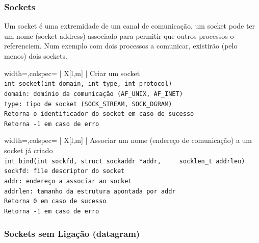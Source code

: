 \documentclass[11pt]{article}
\begin{document}
\subsubsection{Sockets}

Um socket é uma extremidade de um canal de comunicação, um socket pode ter um nome (socket address) associado para permitir que outros processos o referenciem. Num exemplo com dois processos a comunicar, existirão (pelo menos) dois sockets.

\begin{tblr}{width=\linewidth,colspec={ | X[l,m] | }}
    \hline
    \centering Criar um socket                                       \\\hline
    \lstinline|int socket(int domain, int type, int protocol)|       \\\hline
    \lstinline|domain: domínio da comunicação (AF_UNIX, AF_INET)|    \\
    \lstinline|type: tipo de socket (SOCK_STREAM, SOCK_DGRAM)|       \\\hline
    \lstinline|Retorna o identificador do socket em caso de sucesso| \\
    \lstinline|Retorna -1 em caso de erro|                           \\\hline
\end{tblr}

\begin{tblr}{width=\linewidth,colspec={ | X[l,m] | }}
    \hline
    \centering Associar um nome (endereço de comunicação) a um socket já criado \\\hline
    \lstinline|int bind(int sockfd, struct sockaddr *addr,
    socklen_t addrlen)|                                                         \\\hline
    \lstinline|sockfd: file descriptor do socket|                               \\
    \lstinline|addr: endereço a associar ao socket|                             \\
    \lstinline|addrlen: tamanho da estrutura apontada por addr|                 \\\hline
    \lstinline|Retorna 0 em caso de sucesso|                                    \\
    \lstinline|Retorna -1 em caso de erro|                                      \\\hline
\end{tblr}

\subsubsection*{Sockets sem Ligação (datagram)}
\end{document}
